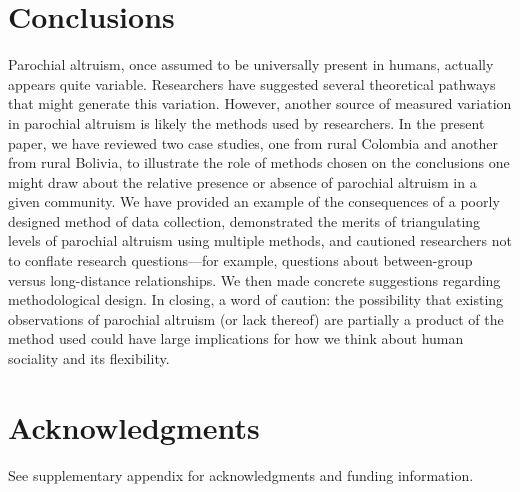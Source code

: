 \documentclass[bibauthoryear]{aa}
\begin{document}

\section{Conclusions}

Parochial altruism, once assumed to be universally present in humans, actually appears quite variable. Researchers have suggested several theoretical pathways that might generate this variation. %
However, another source of measured variation in  parochial altruism is likely the methods used by researchers. In the present paper, we have reviewed two case studies, one from rural Colombia and another from rural Bolivia, to illustrate the role of methods chosen on the conclusions one might draw about the relative presence or absence of parochial altruism in a given community. We have provided an example of the consequences of a poorly designed method of data collection, demonstrated the merits of triangulating levels of parochial altruism using multiple methods, and cautioned researchers not to conflate research questions---for example, questions about between-group versus long-distance relationships. We then made concrete suggestions regarding methodological design. In closing, a word of caution: the possibility that existing observations of parochial altruism (or lack thereof) are partially a product of the method used could have large implications for how we think about human sociality and its flexibility.

\section*{Acknowledgments}
See supplementary appendix for acknowledgments and funding information.





\end{document}
